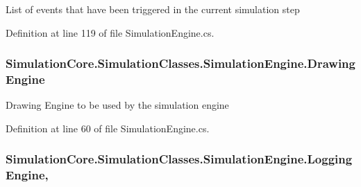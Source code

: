 List of events that have been triggered in the current simulation step 



Definition at line 119 of file Simulation\+Engine.\+cs.

\subsubsection[{\texorpdfstring{Drawing\+Engine}{DrawingEngine}}]{ Simulation\+Core.\+Simulation\+Classes.\+Simulation\+Engine.\+Drawing\+Engine\hspace{0.3cm}{\ttfamily [get]}}\hypertarget{class_simulation_core_1_1_simulation_classes_1_1_simulation_engine_a005278c481e393bfffff3214c5d563d2}{}\label{class_simulation_core_1_1_simulation_classes_1_1_simulation_engine_a005278c481e393bfffff3214c5d563d2}


Drawing Engine to be used by the simulation engine 



Definition at line 60 of file Simulation\+Engine.\+cs.

\subsubsection[{\texorpdfstring{Logging\+Engine}{LoggingEngine}}]{ Simulation\+Core.\+Simulation\+Classes.\+Simulation\+Engine.\+Logging\+Engine\hspace{0.3cm}{\ttfamily [get]}, {\ttfamily [set]}}\hypertarget{class_simulation_core_1_1_simulation_classes_1_1_simulation_engine_aa9344017a15ad179186a73305404c063}{}\label{class_simulation_core_1_1_simulation_classes_1_1_simulation_engine_aa9344017a15ad179186a73305404c063}


